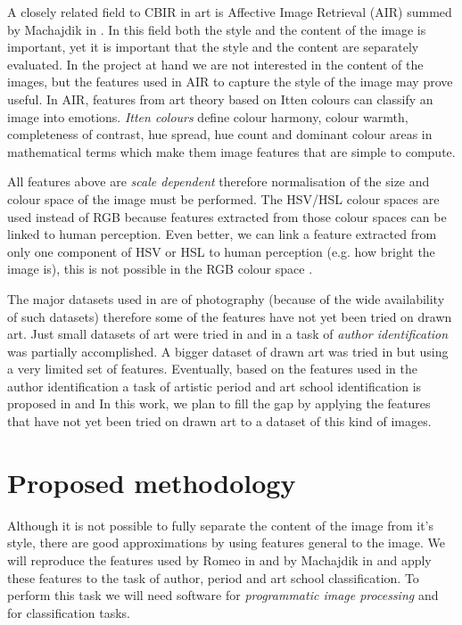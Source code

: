 \documentclass[a4paper]{article}
\begin{document}
A closely related field to CBIR in art is Affective Image Retrieval (AIR)
summed by Machajdik in \cite{mach10ua,mach10clas}.  In this field both the
style and the content of the image is important, yet it is important that the
style and the content are separately evaluated.  In the project at hand we are
not interested in the content of the images, but the features used in AIR to
capture the style of the image may prove useful.  In AIR, features from art
theory based on Itten colours can classify an image into emotions.  \emph{Itten
colours} define colour harmony, colour warmth, completeness of contrast, hue
spread, hue count and dominant colour areas in mathematical terms which make
them image features that are simple to compute.

All features above are \emph{scale dependent} \cite{rmc12ajs,mach10clas}
therefore normalisation of the size and colour space of the image must be
performed.  The HSV/HSL colour spaces are used instead of RGB because features
extracted from those colour spaces can be linked to human perception.  Even
better, we can link a feature extracted from only one component of HSV or HSL
to human perception (e.g. how bright the image is), this is not possible in the
RGB colour space \cite{rmc12ajs}.

The major datasets used in \cite{rmc12ajs,mach10clas} are of photography
(because of the wide availability of such datasets) therefore some of the
features have not yet been tried on drawn art.  Just small datasets of art were
tried in \cite{mach10clas} and in \cite{rmc12ajs} a task of \emph{author
identification} was partially accomplished.  A bigger dataset of drawn art was
tried in \cite{zirnhelt07art} but using a very limited set of features.
Eventually, based on the features used in the author identification a task of
artistic period and art school identification is proposed in
\cite{zirnhelt07art} and \cite{rmc12ajs} In this work, we plan to fill the gap
by applying the features that have not yet been tried on drawn art to a dataset
of this kind of images.

\section{Proposed methodology}

Although it is not possible to fully separate the content of the image from
it's style, there are good approximations by using features general to the
image.  We will reproduce the features used by Romeo in \cite{rmc12ajs} and by
Machajdik in \cite{mach10clas} and apply these features to the task of author,
period and art school classification.  To perform this task we will need
software for \emph{programmatic image processing} and for classification tasks.
\end{document}
